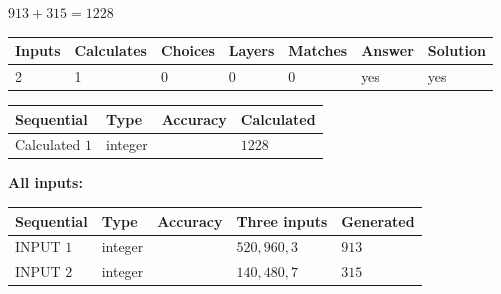 \documentclass{ctexart}
\begin{document}
 
\noindent{}
 
 

 
 
 
\noindent{}
 
 

$ %
913 +  %
315=   %
1228$
 
 
\noindent{}
 
 

 
   
   
   
   
\noindent\begin{tabular}{|l|l|l|l|l|l|l|}
 \hline
Inputs & Calculates & Choices & Layers & Matches & Answer & Solution \\ \hline
 2  & 
 1  & 
 0
  & 
 0  & 
 0  & 
  yes & 
  yes 
  \\ \hline
 \end{tabular}
   
   
   
   
\noindent{}
   
   
  
  
\noindent\begin{tabular}{|l|l|l|l|}
\hline
 Sequential & Type & Accuracy & Calculated \\ 
\hline
 
 
  Calculated $  1 $ & integer &  & 
  $ 1228 $ 
 \\  \hline  
 \end{tabular}
   
   
   
   
\noindent\vspace{0.1in}\hspace{-0.08in} {\textbf{\Large{All inputs: }}}
   
   
  
  
\noindent\begin{tabular}{|l|l|l|l|l|}
\hline
 Sequential & Type & Accuracy & Three inputs & Generated \\ 
\hline
 
 
  INPUT $  1 $ & integer &  & $
 520
 , 
 960
 , 
 3
 $ & $ 913 $ 
 \\  \hline  
 
 
  INPUT $  2 $ & integer &  & $
 140
 , 
 480
 , 
 7
 $ & $ 315 $ 
 \\  \hline  
 \end{tabular}
   
\end{document}
